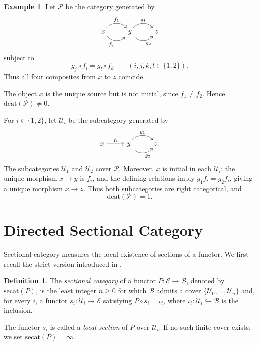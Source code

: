 \documentclass[12pt]{amsart}
\theoremstyle{definition}
\newtheorem{definition}[teo]{Definition}
\newtheorem{example}[teo]{Example}
\theoremstyle{remark}
\numberwithin{figure}{section}%
\newcommand{\Ba}{\mathcal{B}}
\newcommand{\E}{\mathcal{E}}
\newcommand{\Uc}{\mathcal{U}}
\begin{document}
\begin{example}\label{ex:P_LS_Dcat}
Let \(\mathcal P\) be the category generated by
\[
\begin{tikzcd}
x
  \arrow[r, "f_1", bend left=49]
  \arrow[r, "f_2"', bend right=49]
&
y
  \arrow[r, "g_1", bend left=49]
  \arrow[r, "g_2"', bend right=49]
&
z
\end{tikzcd}
\]
subject to
\[
g_j\circ f_i=g_l\circ f_k
\qquad
(i,j,k,l\in\{1,2\}).
\]
Thus all four composites from \(x\) to \(z\) coincide.

The object \(x\) is the unique source but is not initial, since
\(f_1\neq f_2\). Hence
\(\mathrm{dcat}(\mathcal P)\neq0\).

For \(i\in\{1,2\}\), let \(\Uc_i\) be the subcategory generated by
\[
\begin{tikzcd}
x \arrow[r, "f_i"]
&
y
  \arrow[r, "g_1", bend left=49]
  \arrow[r, "g_2"', bend right=49]
&
z .
\end{tikzcd}
\]
The subcategories \(\Uc_1\) and \(\Uc_2\) cover \(\mathcal P\). Moreover,
\(x\) is initial in each \(\Uc_i\): the unique morphism \(x\to y\) is
\(f_i\), and the defining relations imply
\(g_1f_i=g_2f_i\), giving a unique morphism \(x\to z\). Thus both
subcategories are right categorical, and
\[
\mathrm{dcat}(\mathcal P)=1.
\]
\end{example}

\section{Directed Sectional Category}
\label{sec:directed_sectional_category}

Sectional category measures the local existence of sections of a functor.
We first recall the strict version introduced in
\cite{Baues-Isaac}.

\begin{definition}\label{def:strict_sectional_category}
The \emph{sectional category} of a functor \(P\colon\E\to\Ba\), denoted by
\(\mathrm{secat}(P)\), is the least integer \(n\geq0\) for which \(\Ba\)
admits a cover \(\{\Uc_0,\ldots,\Uc_n\}\) and, for every \(i\), a functor
\(s_i\colon\Uc_i\to\E\) satisfying \(P\circ s_i=\iota_i\), where
\(\iota_i\colon\Uc_i\hookrightarrow\Ba\) is the inclusion.

The functor \(s_i\) is called a \emph{local section} of \(P\) over
\(\Uc_i\). If no such finite cover exists, we set
\(\mathrm{secat}(P)=\infty\).
\end{definition}
\end{document}
